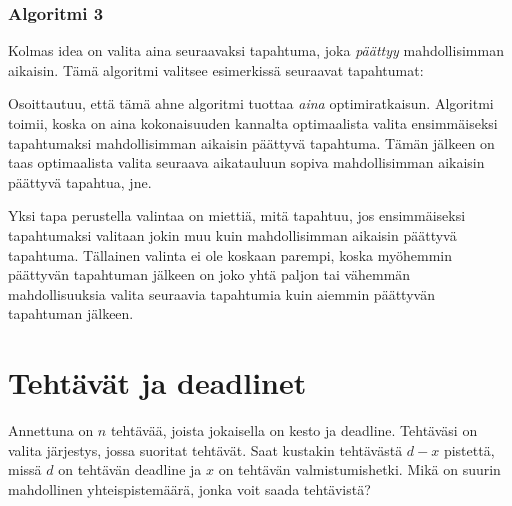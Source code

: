 \subsubsection*{Algoritmi 3}

Kolmas idea on valita aina seuraavaksi tapahtuma,
joka \emph{päättyy} mahdollisimman aikaisin.
Tämä algoritmi valitsee esimerkissä seuraavat tapahtumat:
\begin{center}
\end{center}

Osoittautuu, että tämä ahne algoritmi
tuottaa \textit{aina} optimiratkaisun.
Algoritmi toimii, koska on aina kokonaisuuden
kannalta optimaalista valita
ensimmäiseksi tapahtumaksi
mahdollisimman aikaisin päättyvä tapahtuma.
Tämän jälkeen on taas optimaalista
valita seuraava aikatauluun sopiva
mahdollisimman aikaisin
päättyvä tapahtua, jne.

Yksi tapa perustella valintaa on miettiä,
mitä tapahtuu, jos ensimmäiseksi tapahtumaksi
valitaan jokin muu kuin mahdollisimman
aikaisin päättyvä tapahtuma.
Tällainen valinta ei ole koskaan parempi,
koska myöhemmin päättyvän tapahtuman
jälkeen on joko yhtä paljon tai vähemmän
mahdollisuuksia valita seuraavia tapahtumia
kuin aiemmin päättyvän tapahtuman jälkeen.

\section{Tehtävät ja deadlinet}

Annettuna on $n$ tehtävää,
joista jokaisella on kesto ja deadline.
Tehtäväsi on valita järjestys,
jossa suoritat tehtävät.
Saat kustakin tehtävästä $d-x$ pistettä,
missä $d$ on tehtävän deadline ja $x$
on tehtävän valmistumishetki.
Mikä on suurin mahdollinen
yhteispistemäärä, jonka voit saada tehtävistä?

